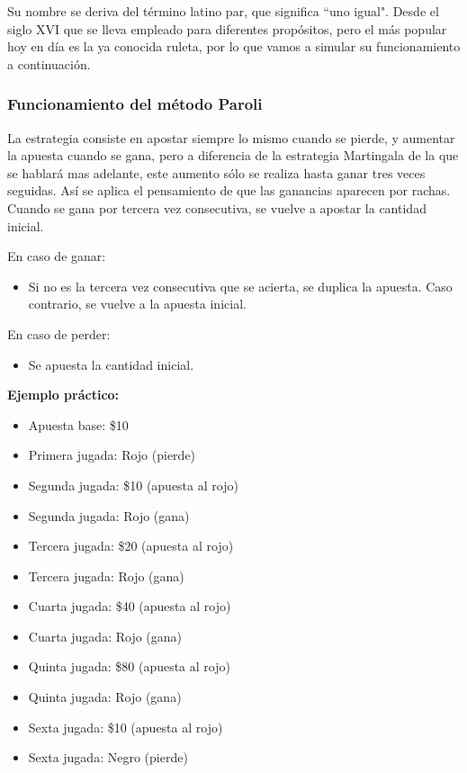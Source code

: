 \documentclass{article}
\begin{document}
Su nombre se deriva del término latino par, que significa “uno igual". Desde el siglo XVI que se lleva empleado para diferentes propósitos, pero el más popular hoy en día es la ya conocida ruleta, por lo que vamos a simular su funcionamiento a continuación.

\subsubsection{Funcionamiento del método Paroli}

La estrategia consiste en apostar siempre lo mismo cuando se pierde, y aumentar la apuesta cuando se gana, pero a diferencia de la estrategia Martingala de la que se hablará mas adelante, este aumento sólo se realiza hasta ganar tres veces seguidas. Así se aplica el pensamiento de que las ganancias aparecen por rachas. Cuando se gana por tercera vez consecutiva, se vuelve a apostar la cantidad inicial.

En caso de ganar:

\begin{itemize}
    \item Si no es la tercera vez consecutiva que se acierta, se duplica la apuesta. Caso contrario, se vuelve a la apuesta inicial.
\end{itemize}

En caso de perder:

\begin{itemize}
    \item Se apuesta la cantidad inicial.
\end{itemize}

\textbf{Ejemplo práctico:}

\begin{itemize}
    \item Apuesta base: \$10
    \item Primera jugada: Rojo (pierde)
    \item Segunda jugada: \$10 (apuesta al rojo)
    \item Segunda jugada: Rojo (gana)
    \item Tercera jugada: \$20 (apuesta al rojo)
    \item Tercera jugada: Rojo (gana)
    \item Cuarta jugada: \$40 (apuesta al rojo)
    \item Cuarta jugada: Rojo (gana)
    \item Quinta jugada: \$80 (apuesta al rojo)
    \item Quinta jugada: Rojo (gana)
    \item Sexta jugada: \$10 (apuesta al rojo)
    \item Sexta jugada: Negro (pierde)
\end{itemize}
\end{document}
